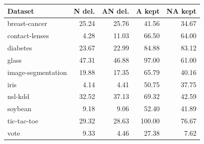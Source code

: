 \begin{tabular}{lrrrr}
\toprule
Dataset & N del. & AN del. & A kept & NA kept \\
\midrule
breast-cancer & 25.24 & 25.76 & 41.56 & 34.67 \\
contact-lenses & 4.28 & 11.03 & 66.50 & 64.00 \\
diabetes & 23.67 & 22.99 & 84.88 & 83.12 \\
glass & 47.31 & 46.88 & 97.00 & 61.00 \\
image-segmentation & 19.88 & 17.35 & 65.79 & 40.16 \\
iris & 4.14 & 4.41 & 50.75 & 37.75 \\
nsl-kdd & 32.52 & 37.13 & 69.32 & 42.59 \\
soybean & 9.18 & 9.06 & 52.40 & 41.89 \\
tic-tac-toe & 29.32 & 28.63 & 100.00 & 76.67 \\
vote & 9.33 & 4.46 & 27.38 & 7.62 \\
\bottomrule
\end{tabular}
